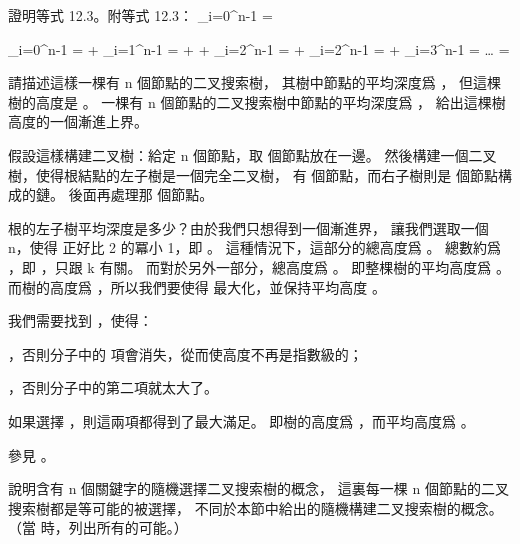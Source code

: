 \startsection[
  title={Randomly built binary search trees},
]

\startEXERCISE
證明等式 12.3。附等式 12.3：
\startformula
\sum_{i=0}^{n-1} = 
\stopformula
\stopEXERCISE

\startANSWER
\startformula\startmathalignment
\NC \sum_{i=0}^{n-1}
    \NC =  + \sum_{i=1}^{n-1} \NR
\NC \NC =  +  + \sum_{i=2}^{n-1} \NR
\NC \NC =  + \sum_{i=2}^{n-1} \NR
\NC \NC =  + \sum_{i=3}^{n-1} \NR
\NC \NC = \ldots \NR
\NC \NC =  \NR
\stopmathalignment\stopformula
\stopANSWER

\startEXERCISE
請描述這樣一棵有 n 個節點的二叉搜索樹，
其樹中節點的平均深度爲 ，
但這棵樹的高度是 。
一棵有 n 個節點的二叉搜索樹中節點的平均深度爲 ，
給出這棵樹高度的一個漸進上界。
\stopEXERCISE

\startANSWER
假設這樣構建二叉樹：給定 n 個節點，取  個節點放在一邊。
然後構建一個二叉樹，使得根結點的左子樹是一個完全二叉樹，
有  個節點，而右子樹則是  個節點構成的鏈。
後面再處理那  個節點。

根的左子樹平均深度是多少？由於我們只想得到一個漸進界，
讓我們選取一個 n，使得  正好比 2 的冪小 1，即 。
這種情況下，這部分的總高度爲 。
總數約爲 ，即 ，只跟 k 有關。
而對於另外一部分，總高度爲 。
即整棵樹的平均高度爲 。
而樹的高度爲 ，所以我們要使得  最大化，並保持平均高度 。

我們需要找到 ，使得：
\startigBase[n]
\item {}，否則分子中的 \m{\log} 項會消失，從而使高度不再是指數級的；
\item {}，否則分子中的第二項就太大了。
\stopigBase

如果選擇 ，則這兩項都得到了最大滿足。
即樹的高度爲 ，而平均高度爲 。

參見 。
\stopANSWER

\startEXERCISE
說明含有 n 個關鍵字的隨機選擇二叉搜索樹的概念，
這裏每一棵 n 個節點的二叉搜索樹都是等可能的被選擇，
不同於本節中給出的隨機構建二叉搜索樹的概念。
（\hint 當  時，列出所有的可能。）
\stopEXERCISE

